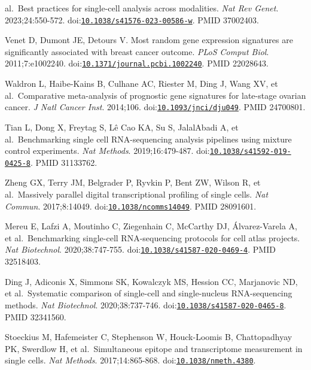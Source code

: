 \documentclass[11pt]{article}
\begin{document}
\begin{enumerate}[label={[\arabic*]},leftmargin=2.6em,labelsep=0.5em,itemsep=1.5pt]
  al.~Best practices for single-cell analysis across modalities.
  \emph{Nat Rev Genet}. 2023;24:550-572.
  doi:\href{https://doi.org/10.1038/s41576-023-00586-w}{\nolinkurl{10.1038/s41576-023-00586-w}}.
  PMID 37002403.
\item
  Venet D, Dumont JE, Detours V. Most random gene expression signatures
  are significantly associated with breast cancer outcome. \emph{PLoS
  Comput Biol}. 2011;7:e1002240.
  doi:\href{https://doi.org/10.1371/journal.pcbi.1002240}{\nolinkurl{10.1371/journal.pcbi.1002240}}.
  PMID 22028643.
\item
  Waldron L, Haibe-Kains B, Culhane AC, Riester M, Ding J, Wang XV, et
  al.~Comparative meta-analysis of prognostic gene signatures for
  late-stage ovarian cancer. \emph{J Natl Cancer Inst}. 2014;106.
  doi:\href{https://doi.org/10.1093/jnci/dju049}{\nolinkurl{10.1093/jnci/dju049}}.
  PMID 24700801.
\item
  Tian L, Dong X, Freytag S, Lê Cao KA, Su S, JalalAbadi A, et
  al.~Benchmarking single cell RNA-sequencing analysis pipelines using
  mixture control experiments. \emph{Nat Methods}. 2019;16:479-487.
  doi:\href{https://doi.org/10.1038/s41592-019-0425-8}{\nolinkurl{10.1038/s41592-019-0425-8}}.
  PMID 31133762.
\item
  Zheng GX, Terry JM, Belgrader P, Ryvkin P, Bent ZW, Wilson R, et
  al.~Massively parallel digital transcriptional profiling of single
  cells. \emph{Nat Commun}. 2017;8:14049.
  doi:\href{https://doi.org/10.1038/ncomms14049}{\nolinkurl{10.1038/ncomms14049}}.
  PMID 28091601.
\item
  Mereu E, Lafzi A, Moutinho C, Ziegenhain C, McCarthy DJ,
  Álvarez-Varela A, et al.~Benchmarking single-cell RNA-sequencing
  protocols for cell atlas projects. \emph{Nat Biotechnol}.
  2020;38:747-755.
  doi:\href{https://doi.org/10.1038/s41587-020-0469-4}{\nolinkurl{10.1038/s41587-020-0469-4}}.
  PMID 32518403.
\item
  Ding J, Adiconis X, Simmons SK, Kowalczyk MS, Hession CC, Marjanovic
  ND, et al.~Systematic comparison of single-cell and single-nucleus
  RNA-sequencing methods. \emph{Nat Biotechnol}. 2020;38:737-746.
  doi:\href{https://doi.org/10.1038/s41587-020-0465-8}{\nolinkurl{10.1038/s41587-020-0465-8}}.
  PMID 32341560.
\item
  Stoeckius M, Hafemeister C, Stephenson W, Houck-Loomis B,
  Chattopadhyay PK, Swerdlow H, et al.~Simultaneous epitope and
  transcriptome measurement in single cells. \emph{Nat Methods}.
  2017;14:865-868.
  doi:\href{https://doi.org/10.1038/nmeth.4380}{\nolinkurl{10.1038/nmeth.4380}}.

\end{enumerate}
\end{document}
